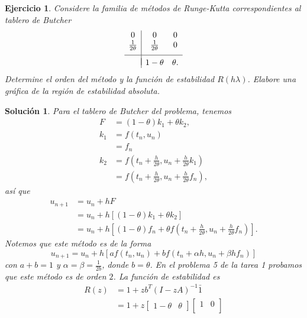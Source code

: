 \documentclass[11pt]{article}
\newtheorem{exercise}{Ejercicio}
\newtheorem*{sol}{Solución}
\begin{document}
\begin{exercise}
  Considere la familia de métodos de Runge-Kutta correspondientes al
  table\-ro de Butcher
  \begin{equation}
    \begin{array}{c|cc}
      0 & 0 & 0 \\
      \frac{1}{2\theta} & \frac{1}{2\theta} & 0 \\[2mm]
      \hline \\[-3mm]
                        & 1-\theta & \theta.
    \end{array}
  \end{equation}
  Determine el orden del método y la función de estabilidad
  $R(h\lambda)$. Elabore una gráfica de la región de estabilidad
  absoluta.
\end{exercise}
\begin{sol}
  Para el tablero de Butcher del problema, tenemos
  \begin{align}
    F
      &= (1-\theta)k_1 + \theta k_2, \\
    k_1
      &= f(t_n, u_n) \\
      &= f_n \\
    k_2
      &= f(t_n+\tfrac{h}{2\theta}, u_n+\tfrac{h}{2\theta}k_1) \\
      &= f(t_n+\tfrac{h}{2\theta}, u_n+\tfrac{h}{2\theta}f_n),
  \end{align}
  así que
  \begin{align}
    u_{n+1}
    &= u_n + hF \\
    &= u_n + h[(1-\theta)k_1 + \theta k_2] \\
    &= u_n + h[(1-\theta)f_n
    + \theta f(t_n+\tfrac{h}{2\theta}, u_n+\tfrac{h}{2\theta}f_n)].
  \end{align}
  Notemos que este método es de la forma
  \begin{equation}
    u_{n+1}
    = u_n + h[af(t_n,u_n) + bf(t_n+\alpha h, u_n+\beta h f_n)]
  \end{equation}
  con $a+b=1$ y $\alpha=\beta=\frac{1}{2b}$, donde $b=\theta$. En el
  problema 5 de la tarea 1 probamos que este método es de orden $2$.
  La función de estabilidad es 
  \begin{align}
    R(z)
    &= 1 + zb^T(I-zA)^{-1}\bar 1 \\
    &= 1 + z
      \begin{bmatrix}
        1-\theta & \theta
      \end{bmatrix}
      \begin{bmatrix}
        1 & 0 \\

\end{bmatrix}
\end{align}
\end{sol}
\end{document}
